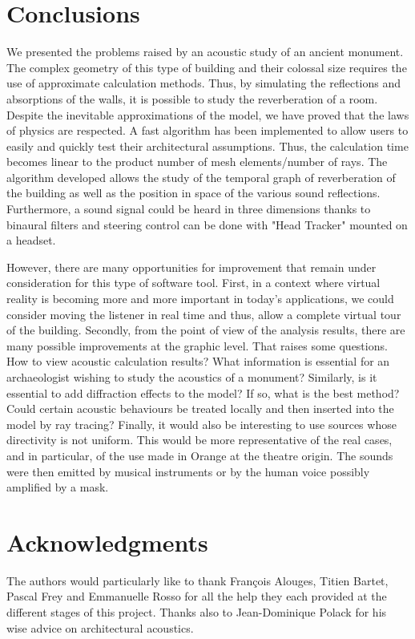 \documentclass[AMA,STIX1COL]{WileyNJD-v2}
\begin{document}
\section{Conclusions}

We presented the problems raised by an acoustic study of an ancient monument. The complex geometry of this type of building and their colossal size requires the use of approximate calculation methods. Thus, by simulating the reflections and absorptions of the walls, it is possible to study the reverberation of a room. Despite the inevitable approximations of the model, we have proved that the laws of physics are respected. A fast algorithm has been implemented to allow users to easily and quickly test their architectural assumptions. Thus, the calculation time becomes linear to the product number of mesh elements/number of rays. The algorithm developed allows the study of the temporal graph of reverberation of the building as well as the position in space of the various sound reflections. Furthermore, a sound signal could be heard in three dimensions thanks to binaural filters and steering control can be done with "Head Tracker" mounted on a headset.

However, there are many opportunities for improvement that remain under consideration for this type of software tool. First, in a context where virtual reality is becoming more and more important in today's applications, we could consider moving the listener in real time and thus, allow a complete virtual tour of the building. Secondly, from the point of view of the analysis results, there are many possible improvements at the graphic level. That raises some questions. How to view acoustic calculation results? What information is essential for an archaeologist wishing to study the acoustics of a monument? Similarly, is it essential to add diffraction effects to the model? If so, what is the best method? Could certain acoustic behaviours be treated locally and then inserted into the model by ray tracing? Finally, it would also be interesting to use sources whose directivity is not uniform. This would be more representative of the real cases, and in particular, of the use made in Orange at the theatre origin. The sounds were then emitted by musical instruments or by the human voice possibly amplified by a mask.



\section*{Acknowledgments}
The authors would particularly like to thank Fran\c{c}ois Alouges, Titien Bartet, Pascal Frey and Emmanuelle Rosso for all the help they each provided at the different stages of this project. Thanks also to Jean-Dominique Polack for his wise advice on architectural acoustics.
\end{document}
